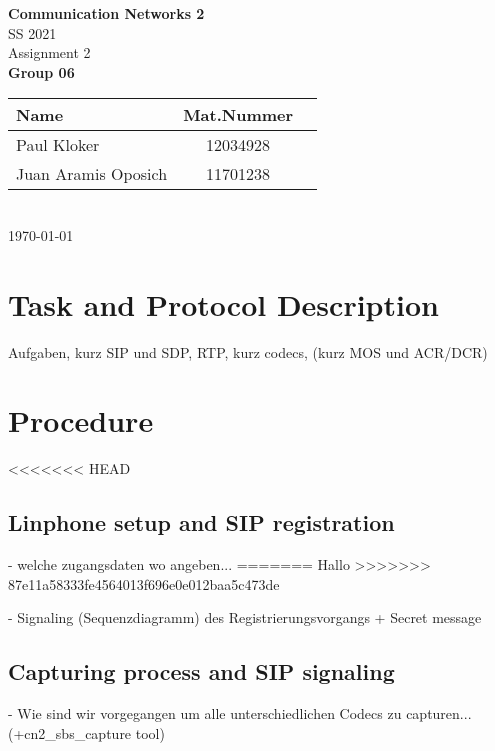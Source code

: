 \documentclass[parskip=full]{scrartcl}
\begin{document}
\begin{titlepage}
    \centering
    \vspace*{2cm}
    {\Huge \textbf{Communication Networks 2}}\\
    SS 2021\\
    \vspace*{1cm}
    {\Large Assignment 2}
    \\\vspace*{3cm}
    {\Large \textbf{Group 06}}\\
    \vspace*{1cm}
    {\large 
        \begin{tabular}{l c c}
            Name & Mat.Nummer \\ \hline
            Paul Kloker & 12034928 \\
            Juan Aramis Oposich & 11701238
        \end{tabular}
    }
    \\\vspace*{7cm}
    \today
\end{titlepage}

\section{Task and Protocol Description} \label{sec:task}
Aufgaben, kurz SIP und SDP, RTP, kurz codecs, (kurz MOS und ACR/DCR)
\section{Procedure} \label{sec:procedure}

<<<<<<< HEAD
\subsection{Linphone setup and SIP registration} \label{subsec:setup}
- welche zugangsdaten wo angeben... 
=======
Hallo
>>>>>>> 87e11a58333fe4564013f696e0e012baa5c473de

- Signaling (Sequenzdiagramm) des Registrierungsvorgangs + Secret message 
\subsection{Capturing process and SIP signaling} \label{subsec:capture}
- Wie sind wir vorgegangen um alle unterschiedlichen Codecs zu capturen... (+cn2\_sbs\_capture  tool)
\end{document}
